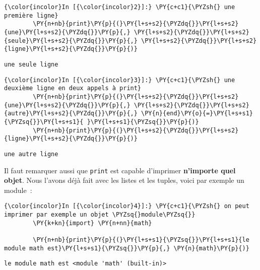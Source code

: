     \begin{Verbatim}[commandchars=\\\{\}]
{\color{incolor}In [{\color{incolor}2}]:} \PY{c+c1}{\PYZsh{} une première ligne}
        \PY{n+nb}{print}\PY{p}{(}\PY{l+s+s2}{\PYZdq{}}\PY{l+s+s2}{une}\PY{l+s+s2}{\PYZdq{}}\PY{p}{,} \PY{l+s+s2}{\PYZdq{}}\PY{l+s+s2}{seule}\PY{l+s+s2}{\PYZdq{}}\PY{p}{,} \PY{l+s+s2}{\PYZdq{}}\PY{l+s+s2}{ligne}\PY{l+s+s2}{\PYZdq{}}\PY{p}{)}
\end{Verbatim}


    \begin{Verbatim}[commandchars=\\\{\}]
une seule ligne

    \end{Verbatim}

    \begin{Verbatim}[commandchars=\\\{\}]
{\color{incolor}In [{\color{incolor}3}]:} \PY{c+c1}{\PYZsh{} une deuxième ligne en deux appels à print}
        \PY{n+nb}{print}\PY{p}{(}\PY{l+s+s2}{\PYZdq{}}\PY{l+s+s2}{une}\PY{l+s+s2}{\PYZdq{}}\PY{p}{,} \PY{l+s+s2}{\PYZdq{}}\PY{l+s+s2}{autre}\PY{l+s+s2}{\PYZdq{}}\PY{p}{,} \PY{n}{end}\PY{o}{=}\PY{l+s+s1}{\PYZsq{}}\PY{l+s+s1}{ }\PY{l+s+s1}{\PYZsq{}}\PY{p}{)}
        \PY{n+nb}{print}\PY{p}{(}\PY{l+s+s2}{\PYZdq{}}\PY{l+s+s2}{ligne}\PY{l+s+s2}{\PYZdq{}}\PY{p}{)}
\end{Verbatim}


    \begin{Verbatim}[commandchars=\\\{\}]
une autre ligne

    \end{Verbatim}

    Il faut remarquer aussi que \texttt{print} est capable d'imprimer
\textbf{n'importe quel objet}. Nous l'avons déjà fait avec les listes et
les tuples, voici par exemple un module~:

    \begin{Verbatim}[commandchars=\\\{\}]
{\color{incolor}In [{\color{incolor}4}]:} \PY{c+c1}{\PYZsh{} on peut imprimer par exemple un objet \PYZsq{}module\PYZsq{}}
        \PY{k+kn}{import} \PY{n+nn}{math}
        
        \PY{n+nb}{print}\PY{p}{(}\PY{l+s+s1}{\PYZsq{}}\PY{l+s+s1}{le module math est}\PY{l+s+s1}{\PYZsq{}}\PY{p}{,} \PY{n}{math}\PY{p}{)}
\end{Verbatim}


    \begin{Verbatim}[commandchars=\\\{\}]
le module math est <module 'math' (built-in)>

    \end{Verbatim}

